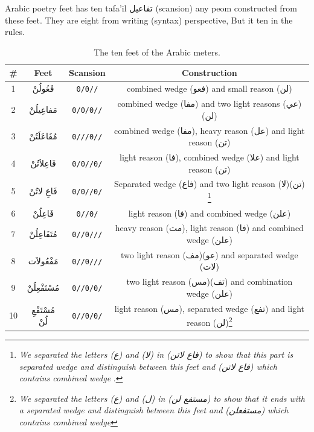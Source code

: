 Arabic poetry feet has ten tafa'il \textarabic{تفاعيل} (scansion)  any peom constructed from these feet. They are eight from writing (syntax) perspective, But it ten in the rules.
\begin{savenotes}

\begin{table}[H]
  \centering
  \begin{tabular}{|c|c|c|c|}
    \hline
    \textbf{\#} & \textbf{Feet} & \textbf{Scansion} & \textbf{Construction} \\
    \hline
    1 & \textarabic{فَعُولُنْ}  & \texttt{0/0//} & combined wedge (\textarabic{فعو}) and small reason (\textarabic{لن})   \\
    2 &\textarabic{مَفاعِيلُنْ}& \texttt{0/0/0//} & combined wedge (\textarabic{مفا}) and two light reasons (\textarabic{عي}) (\textarabic{لن})   \\
    3 &\textarabic{مُفَاعَلَتُنْ}& \texttt{0///0//}  &    combined wedge (\textarabic{مفا}), heavy reason (\textarabic{عل}) and light reason (\textarabic{تن}) \\
    4 &\textarabic{فَاعِلاَتُنْ} & \texttt{0/0//0/}   & light reason (\textarabic{فا}), combined wedge (\textarabic{علا}) and light reason (\textarabic{تن})   \\
    5 &\textarabic{فَاعِ لاتُنْ} & \texttt{0/0//0/}  &  Separated wedge (\textarabic{فاع}) and two light reason (\textarabic{لا})(\textarabic{تن}) \footnote{\textit{We separated the letters (\textarabic{ع}) and (\textarabic{لا}) in (\textarabic{فاع لاتن}) to show that this part is separated wedge and distinguish between this feet  and (\textarabic{فاع لاتن}) which contains combined wedge  }.}  \\
    6 &\textarabic{فَاعِلُنْ}  & \texttt{0//0/}   & light reason (\textarabic{فا}) and combined wedge (\textarabic{علن})\\
    7 &\textarabic{مُتَفَاعِلُنْ}& \texttt{0//0///}  & heavy reason (\textarabic{مت}), light reason (\textarabic{فا}) and combined wedge (\textarabic{علن})  \\
    8 &\textarabic{مَفْعُولاَت} & \texttt{0//0///}   & two light reason (\textarabic{مف})(\textarabic{عو}) and separated wedge (\textarabic{لات}) \\
    9 &\textarabic{مُسْتَفْعِلُنْ} & \texttt{0//0/0/}  &  two light reason (\textarabic{مس})(\textarabic{تف}) and combination wedge (\textarabic{علن}) \\
    10 &\textarabic{مُسْتَفْعِ لُنْ} & \texttt{0//0/0/}  & light reason (\textarabic{مس}), separated wedge  (\textarabic{تفع}) and light reason  (\textarabic{لن})\footnote{\textit{We separated the letters (\textarabic{ع}) and (\textarabic{ل}) in (\textarabic{مستفع لن}) to show that it ends with a separated wedge and distinguish between this feet  and (\textarabic{مستفعلن}) which contains combined wedge }}\\


    \hline
  \end{tabular}
  \caption{The ten feet of the Arabic meters. }\label{arud:feet}
\end{table}
    \end{savenotes}

